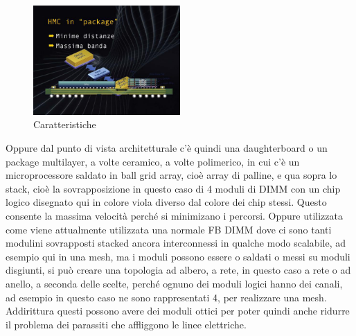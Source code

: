 \FloatBarrier
\begin{figure}[H]
  \centering
  \includegraphics[width=0.50\textwidth,
                    trim=20 20 20 20, %
                    clip]
                    {images/Lez05_p04_fig_06.png}
  \caption{Caratteristiche}
  \label{fig:Lez05_p04_fig_06}
\end{figure}
\FloatBarrier
\noindent

Oppure dal punto di vista architetturale c'è quindi una daughterboard o un package multilayer, a volte ceramico, a volte polimerico, in cui c'è un microprocessore saldato in ball grid array, cioè array di palline, e qua sopra lo stack, cioè la sovrapposizione in questo caso di 4 moduli di DIMM con un chip logico disegnato qui in colore viola diverso dal colore dei chip stessi.
Questo consente la massima velocità perché si minimizano i percorsi.
Oppure utilizzata come viene attualmente utilizzata una normale FB DIMM dove ci sono tanti modulini sovrapposti stacked ancora interconnessi in qualche modo scalabile, ad esempio qui in una mesh, ma i moduli possono essere o saldati o messi su moduli disgiunti, si può creare una topologia ad albero, a rete, in questo caso a rete o ad anello, a seconda delle scelte, perché ognuno dei moduli logici hanno dei canali, ad esempio in questo caso ne sono rappresentati 4, per realizzare una mesh.
Addirittura questi possono avere dei moduli ottici per poter quindi anche ridurre il problema dei parassiti che affliggono le linee elettriche.
